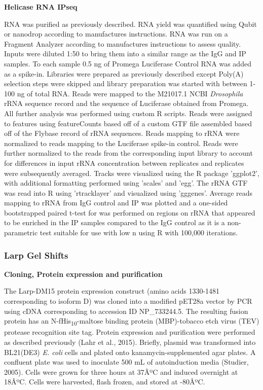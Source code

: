 \documentclass[12pt,oneside]{reedthesis}
\begin{document}
\textbf{Helicase RNA IPseq}

RNA was purified as previously described. RNA yield was quantified using
Qubit or nanodrop according to manufactures instructions. RNA was run on
a Fragment Analyzer according to manufactures instructions to assess
quality. Inputs were diluted 1:50 to bring them into a similar range as
the IgG and IP samples. To each sample 0.5 ng of Promega Luciferase
Control RNA was added as a spike-in. Libraries were prepared as
previously described except Poly(A) selection steps were skipped and
library preparation was started with between 1-100 ng of total RNA.
Reads were mapped to the M21017.1 NCBI \emph{Drosophila} rRNA sequence record
and the sequence of Luciferase obtained from Promega. All further
analysis was performed using custom R scripts. Reads were assigned to
features using featureCounts based off of a custom GTF file assembled
based off of the Flybase record of rRNA sequences. Reads mapping to rRNA
were normalized to reads mapping to the Luciferase spike-in control.
Reads were further normalized to the reads from the corresponding input
library to account for differences in input rRNA concentration between
replicates and replicates were subsequently averaged. Tracks were
visualized using the R package 'ggplot2', with additional formatting
performed using 'scales' and 'egg'. The rRNA GTF was read into R using
'rtracklayer' and visualized using 'gggenes'. Average reads mapping to
rRNA from IgG control and IP was plotted and a one-sided bootstrapped
paired t-test for was performed on regions on rRNA that appeared to be
enriched in the IP samples compared to the IgG control as it is a
non-parametric test suitable for use with low n using R with 100,000
iterations.

\hypertarget{larp-gel-shifts}{%
\subsubsection{Larp Gel Shifts}\label{larp-gel-shifts}}

\textbf{Cloning, Protein expression and purification}

The Larp-DM15 protein expression construct (amino acids 1330-1481
corresponding to isoform D) was cloned into a modified pET28a vector by
PCR using cDNA corresponding to accession ID NP\_733244.5. The resulting
fusion protein has an N-fHis\textsubscript{10}-maltose binding protein (MBP)-tobacco
etch virus (TEV) protease recognition site tag. Protein expression and
purification were performed as described previously
(Lahr et al., 2015). Briefly, plasmid was
transformed into BL21(DE3) \emph{E. coli} cells and plated onto
kanamycin-supplemented agar plates. A confluent plate was used to
inoculate 500 mL of autoinduction media
(Studier, 2005). Cells were grown for
three hours at 37ÂºC and induced overnight at 18ÂºC. Cells were harvested,
flash frozen, and stored at -80ÂºC.
\end{document}
